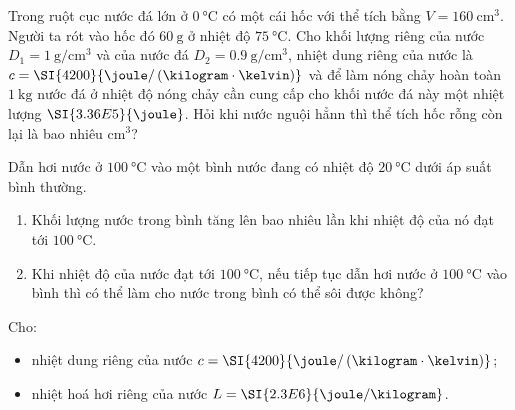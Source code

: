 \begin{ex}
Trong ruột cục nước đá lớn ở $\SI{0}{\celsius}$ có một cái hốc với thể tích bằng $V=\SI{160}{\centi\meter^3}$. Người ta rót vào hốc đó $\SI{60}{\gram}$ ở nhiệt độ $\SI{75}{\celsius}$. Cho khối lượng riêng của nước $D_1=\SI{1}{\gram/\centi\meter^3}$ và của nước đá $D_2=\SI{0.9}{\gram/\centi\meter^3}$, nhiệt dung riêng của nước là $c=\SI{4200}{\joule/\left(\kilogram\cdot\kelvin\right)}$ và để làm nóng chảy hoàn toàn $\SI{1}{\kilogram}$ nước đá ở nhiệt độ nóng chảy cần cung cấp cho khối nước đá này một nhiệt lượng $\SI{3.36E5}{\joule}$. Hỏi khi nước nguội hẳnn thì thể tích hốc rỗng còn lại là bao nhiêu $\si{\centi\meter^3}$?
\end{ex}
\begin{ex}
Dẫn hơi nước ở $\SI{100}{\celsius}$ vào một bình nước đang có nhiệt độ $\SI{20}{\celsius}$ dưới áp suất bình thường.
\begin{enumerate}[label=\alph*)]
	\item Khối lượng nước trong bình tăng lên bao nhiêu lần khi nhiệt độ của nó đạt tới $\SI{100}{\celsius}$.
	\item Khi nhiệt độ của nước đạt tới $\SI{100}{\celsius}$, nếu tiếp tục dẫn hơi nước ở $\SI{100}{\celsius}$ vào bình thì có thể làm cho nước trong bình có thể sôi được không?
\end{enumerate}
Cho:
\begin{itemize}
	\item nhiệt dung riêng của nước $c=\SI{4200}{\joule/\left(\kilogram\cdot\kelvin\right)}$;
	\item nhiệt hoá hơi riêng của nước $L=\SI{2.3E6}{\joule/\kilogram}$.
\end{itemize}
\end{ex}
